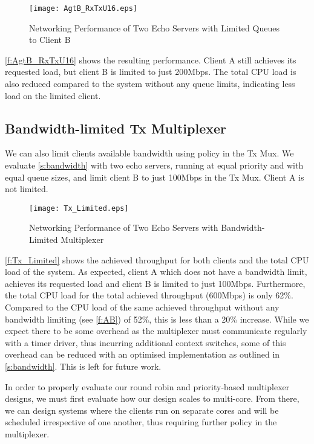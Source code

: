 \begin{figure}[h]
    \centering
    \texttt{[image: AgtB\_RxTxU16.eps]}
    \caption{Networking Performance of Two Echo Servers with Limited Queues to Client B}
    \label{f:AgtB_RxTxU16}
\end{figure}

\autoref{f:AgtB_RxTxU16} shows the resulting performance. Client A still achieves its requested load, but client B is limited
to just 200Mbps. The total CPU load is also reduced compared to the system without any queue limits, indicating less load on 
the limited client.

\subsection{Bandwidth-limited Tx Multiplexer}

We can also limit clients available bandwidth using policy in the Tx Mux. We evaluate \autoref{s:bandwidth} with two echo servers,
running at equal priority and with equal queue sizes, and limit client B to just 100Mbps in the Tx Mux. Client A is not limited.

\begin{figure}[H]
    \centering
    \texttt{[image: Tx\_Limited.eps]}
    \caption{Networking Performance of Two Echo Servers with Bandwidth-Limited Multiplexer}
    \label{f:Tx_Limited}
\end{figure}

\autoref{f:Tx_Limited} shows the achieved throughput for both clients and the total CPU load of the system. As expected, 
client A which does not have a bandwidth limit, achieves its requested load and client B is limited to just 100Mbps. Furthermore, 
the total CPU load for the total achieved throughput (600Mbps) is only 62\%. Compared to the CPU load of the same 
achieved throughput without any bandwidth limiting (see \autoref{f:AB}) of 52\%, this is less than a 20\% increase. While we
expect there to be some overhead as the multiplexer must communicate regularly with a timer driver, thus incurring additional
context switches, some of this overhead can be reduced with an optimised implementation 
as outlined in \autoref{s:bandwidth}. This is left for future work.

In order to properly evaluate our round robin and priority-based multiplexer designs, we must first evaluate how our
design scales to multi-core. From there, we can design systems where the clients run on separate cores and will be scheduled irrespective
of one another, thus requiring further policy in the multiplexer.

